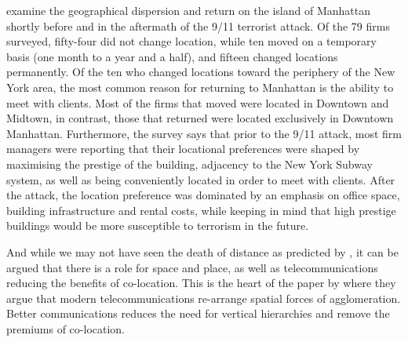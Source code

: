 \cite{gongthe2012} examine the geographical dispersion and return on the island of Manhattan shortly before and in the aftermath of the 9/11 terrorist attack. Of the 79 firms surveyed, fifty-four did not change location, while ten moved on a temporary basis (one month to a year and a half), and fifteen changed locations permanently.  Of the ten who changed locations toward the periphery of the New York area, the most common reason for returning to Manhattan is the ability to meet with clients.  Most of the firms that moved were located in Downtown and Midtown, in contrast,  those that returned were located exclusively in Downtown Manhattan. Furthermore, the survey says that prior to the 9/11 attack, most firm managers were reporting that their locational preferences were shaped by maximising the prestige of the building, adjacency to the New York Subway system, as well as being conveniently located in order to meet with clients.    After the attack, the location preference was dominated by an emphasis on office space, building infrastructure and rental costs, while keeping in mind that high prestige buildings would be more susceptible to terrorism in the future.  
	
And while we may not have seen the death of distance as predicted by \cite{Obrian1992}, it can be argued that there is a role for space and place, as well as telecommunications reducing the benefits of co-location. This is the heart of the paper by \cite{Moriset2009} where they argue that modern telecommunications re-arrange spatial forces of agglomeration.  Better communications reduces the need for vertical hierarchies and remove the premiums of co-location. 
	
	
	
	